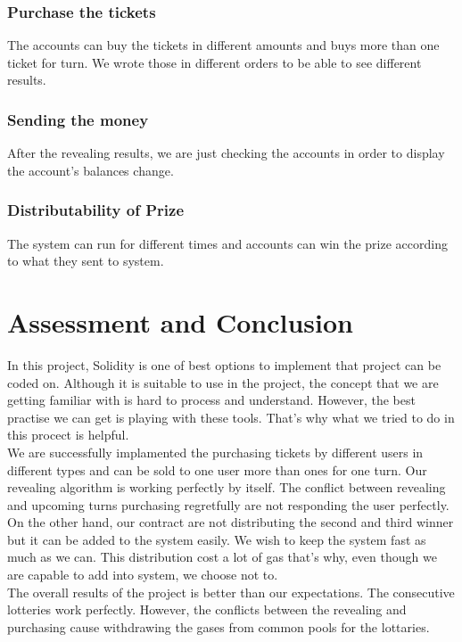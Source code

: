 \documentclass[]{scrreprt}
\begin{document}
			\subsection{Purchase the tickets}
			The accounts can buy the tickets in different amounts and buys more than one ticket for turn. We wrote  those in different orders to be able to see different results. 
			\subsection{Sending the money}
			After the revealing results, we are just checking the accounts in order to display the account's balances change. 
			\subsection{Distributability of Prize}
			The system can run for different times and accounts can win the prize according to what they sent to system.
			
\chapter{Assessment and Conclusion}
In this project, Solidity is one of best options to implement that project can be coded on. Although it is suitable to use in the project, the concept that we are getting familiar with is hard to process and understand. However, the best practise we can get is playing with these tools. That's why what we tried to do in this procect is helpful.\\
We are successfully implamented the purchasing tickets by different users in different types and can be sold to one user more than ones for one turn. Our revealing algorithm is working perfectly by itself. The conflict between revealing and upcoming turns purchasing regretfully are not responding the user perfectly.\\
On the other hand, our contract are not distributing the second and third winner but it can be added to the system easily. We wish to keep the system fast as much as we can. This distribution cost a lot of gas that's why, even though we are capable to add into system, we choose not to. \\
The overall results of the project is better than our expectations. The consecutive lotteries work perfectly. However, the conflicts between the revealing and purchasing cause withdrawing the gases from common pools for the lottaries.

\begin{appendices}


\end{appendices}
\end{document}

